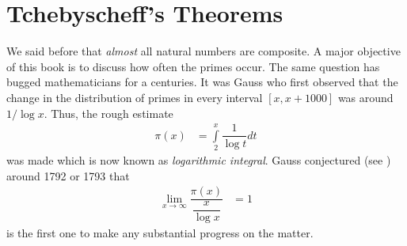\documentclass[elemannt.tex]{subfile}
\begin{document}
	\chapter{Tchebyscheff's Theorems}
	We said before that \textit{almost} all natural numbers are composite. A major objective of this book is to discuss how often the primes occur. The same question has bugged mathematicians for a centuries. It was Gauss who first observed that the change in the distribution of primes in every interval $[x,x+1000]$ was around $1/\log{x}$. Thus, the rough estimate
		\begin{align*}
			\pi(x)
				& = \int\limits_{2}^{x}\dfrac{1}{\log{t}}dt
		\end{align*}
	was made which is now known as \textit{logarithmic integral}. Gauss conjectured (see \textcite[Page 37]{landau_1911}) around 1792 or 1793 that
		\begin{align*}
			\lim\limits_{x\to\infty}\dfrac{\pi(x)}{\dfrac{x}{\log{x}}}
				& = 1
		\end{align*}
	\textcite{tchebycheff_1852} is the first one to make any substantial progress on the matter. %
\end{document}
